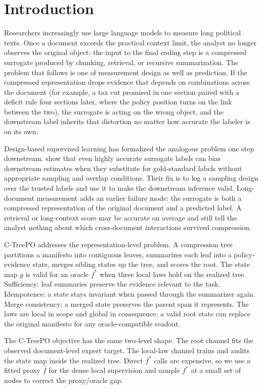 \section{Introduction}\label{sec:v8-introduction}

Researchers increasingly use large language models to measure long
political texts. Once a document exceeds the practical context
limit, the analyst no longer observes the original object: the
input to the final coding step is a compressed surrogate produced by
chunking, retrieval, or recursive summarization. The problem that
follows is one of measurement design as well as prediction. If the
compressed representation drops evidence that depends on combinations
across the document (for example, a tax cut promised in one section
paired with a deficit rule four sections later, where the policy
position turns on the link between the two), the surrogate is acting
on the wrong object, and the downstream label inherits that
distortion no matter how accurate the labeler is on its own.

Design-based supervised learning has formalized the analogous problem
one step downstream. \citet{EgamiEtAl2024} show that even highly
accurate surrogate labels can bias downstream estimates when they
substitute for gold-standard labels without appropriate sampling and
overlap conditions. Their fix is to log a sampling design over the trusted labels and
use it to make the downstream inference valid. Long-document measurement
adds an earlier failure mode: the surrogate is both a compressed
representation of the original document and a predicted label.
A retrieval or long-context score may be accurate on average and
still tell the analyst nothing about which cross-document
interactions survived compression.

C-TreePO addresses the representation-level problem. A compression
tree partitions a manifesto into contiguous leaves, summarizes each
leaf into a policy-evidence state, merges sibling states up the tree,
and scores the root. The state map \(g\) is valid for an oracle
\(f^\ast\) when three local laws hold on the realized tree.
Sufficiency: leaf summaries preserve the evidence relevant to the
task. Idempotence: a state stays invariant when passed through the
summarizer again. Merge consistency: a merged state preserves the
parent span it represents. The laws are local in scope and global in
consequence: a valid root state can replace the original manifesto
for any oracle-compatible readout.

The C-TreePO objective has the same two-level shape. The root channel
fits the observed document-level expert target. The local-law channel
trains and audits the state map inside the realized tree. Direct
\(f^\ast\) calls are expensive, so we use a fitted proxy
\(\widehat f\) for the dense local supervision and sample
\(f^\ast\) at a small set of nodes to correct the proxy/oracle gap.

